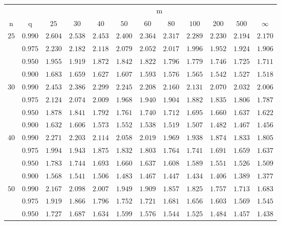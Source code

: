 \documentclass[11pt]{article}
\theoremstyle{definition}
\begin{document}
\begin{table}[H]
	\begin{tabularx}{\linewidth}{c | c | c c c c c c c c c c}
		& & \multicolumn{10}{c}{m}\\
		\cline{3-12}
		n & q & $25$ & $30$ & $40$ & $50$ & $60$ & $80$ & $100$ & $200$ & $500$ & $\infty$\\
		\hline
		$25$ & $0.990$ & $2.604$ & $2.538$ & $2.453$ & $2.400$ & $2.364$ & $2.317$ & $2.289$ & $2.230$ & $2.194$ & $2.170$ \\
		& $0.975$ & $2.230$ & $2.182$ & $2.118$ & $2.079$ & $2.052$ & $2.017$ & $1.996$ & $1.952$ & $1.924$ & $1.906$ \\
		& $0.950$ & $1.955$ & $1.919$ & $1.872$ & $1.842$ & $1.822$ & $1.796$ & $1.779$ & $1.746$ & $1.725$ & $1.711$ \\
		& $0.900$ & $1.683$ & $1.659$ & $1.627$ & $1.607$ & $1.593$ & $1.576$ & $1.565$ & $1.542$ & $1.527$ & $1.518$ \\
		$30$ & $0.990$ & $2.453$ & $2.386$ & $2.299$ & $2.245$ & $2.208$ & $2.160$ & $2.131$ & $2.070$ & $2.032$ & $2.006$ \\
		& $0.975$ & $2.124$ & $2.074$ & $2.009$ & $1.968$ & $1.940$ & $1.904$ & $1.882$ & $1.835$ & $1.806$ & $1.787$ \\
		& $0.950$ & $1.878$ & $1.841$ & $1.792$ & $1.761$ & $1.740$ & $1.712$ & $1.695$ & $1.660$ & $1.637$ & $1.622$ \\
		& $0.900$ & $1.632$ & $1.606$ & $1.573$ & $1.552$ & $1.538$ & $1.519$ & $1.507$ & $1.482$ & $1.467$ & $1.456$ \\
		$40$ & $0.990$ & $2.271$ & $2.203$ & $2.114$ & $2.058$ & $2.019$ & $1.969$ & $1.938$ & $1.874$ & $1.833$ & $1.805$ \\
		& $0.975$ & $1.994$ & $1.943$ & $1.875$ & $1.832$ & $1.803$ & $1.764$ & $1.741$ & $1.691$ & $1.659$ & $1.637$ \\
		& $0.950$ & $1.783$ & $1.744$ & $1.693$ & $1.660$ & $1.637$ & $1.608$ & $1.589$ & $1.551$ & $1.526$ & $1.509$ \\
		& $0.900$ & $1.568$ & $1.541$ & $1.506$ & $1.483$ & $1.467$ & $1.447$ & $1.434$ & $1.406$ & $1.389$ & $1.377$ \\
		$50$ & $0.990$ & $2.167$ & $2.098$ & $2.007$ & $1.949$ & $1.909$ & $1.857$ & $1.825$ & $1.757$ & $1.713$ & $1.683$ \\
		& $0.975$ & $1.919$ & $1.866$ & $1.796$ & $1.752$ & $1.721$ & $1.681$ & $1.656$ & $1.603$ & $1.569$ & $1.545$ \\
		& $0.950$ & $1.727$ & $1.687$ & $1.634$ & $1.599$ & $1.576$ & $1.544$ & $1.525$ & $1.484$ & $1.457$ & $1.438$ \\

\end{tabularx}
\end{table}
\end{document}
